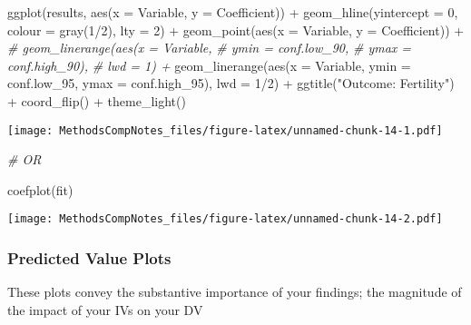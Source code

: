 \documentclass[
]{article}
\newenvironment{Shaded}{\begin{snugshade}}{\end{snugshade}}
\newcommand{\AttributeTok}[1]{\textcolor[rgb]{0.77,0.63,0.00}{#1}}
\newcommand{\CommentTok}[1]{\textcolor[rgb]{0.56,0.35,0.01}{\textit{#1}}}
\newcommand{\DecValTok}[1]{\textcolor[rgb]{0.00,0.00,0.81}{#1}}
\newcommand{\FunctionTok}[1]{\textcolor[rgb]{0.00,0.00,0.00}{#1}}
\newcommand{\NormalTok}[1]{#1}
\newcommand{\SpecialCharTok}[1]{\textcolor[rgb]{0.00,0.00,0.00}{#1}}
\newcommand{\StringTok}[1]{\textcolor[rgb]{0.31,0.60,0.02}{#1}}
\begin{document}
\begin{Shaded}
\begin{Highlighting}[]
\FunctionTok{ggplot}\NormalTok{(results, }\FunctionTok{aes}\NormalTok{(}\AttributeTok{x =}\NormalTok{ Variable, }\AttributeTok{y =}\NormalTok{ Coefficient)) }\SpecialCharTok{+}
        \FunctionTok{geom\_hline}\NormalTok{(}\AttributeTok{yintercept =} \DecValTok{0}\NormalTok{, }\AttributeTok{colour =} \FunctionTok{gray}\NormalTok{(}\DecValTok{1}\SpecialCharTok{/}\DecValTok{2}\NormalTok{), }\AttributeTok{lty =} \DecValTok{2}\NormalTok{) }\SpecialCharTok{+}
        \FunctionTok{geom\_point}\NormalTok{(}\FunctionTok{aes}\NormalTok{(}\AttributeTok{x =}\NormalTok{ Variable, }
                    \AttributeTok{y =}\NormalTok{ Coefficient)) }\SpecialCharTok{+} 
        \CommentTok{\# geom\_linerange(aes(x = Variable, }
        \CommentTok{\#              ymin = conf.low\_90,}
        \CommentTok{\#              ymax = conf.high\_90),}
        \CommentTok{\#            lwd = 1) +}
        \FunctionTok{geom\_linerange}\NormalTok{(}\FunctionTok{aes}\NormalTok{(}\AttributeTok{x =}\NormalTok{ Variable, }
                     \AttributeTok{ymin =}\NormalTok{ conf.low\_95,}
                     \AttributeTok{ymax =}\NormalTok{ conf.high\_95),}
                   \AttributeTok{lwd =} \DecValTok{1}\SpecialCharTok{/}\DecValTok{2}\NormalTok{) }\SpecialCharTok{+} 
        \FunctionTok{ggtitle}\NormalTok{(}\StringTok{"Outcome: Fertility"}\NormalTok{) }\SpecialCharTok{+}
        \FunctionTok{coord\_flip}\NormalTok{() }\SpecialCharTok{+}
  \FunctionTok{theme\_light}\NormalTok{()}
\end{Highlighting}
\end{Shaded}

\texttt{[image: MethodsCompNotes\_files/figure-latex/unnamed-chunk-14-1.pdf]}

\begin{Shaded}
\begin{Highlighting}[]
\CommentTok{\# OR}

\FunctionTok{coefplot}\NormalTok{(fit)}
\end{Highlighting}
\end{Shaded}

\texttt{[image: MethodsCompNotes\_files/figure-latex/unnamed-chunk-14-2.pdf]}

\hypertarget{predicted-value-plots}{%
\subsubsection{Predicted Value Plots}\label{predicted-value-plots}}

These plots convey the substantive importance of your findings; the
magnitude of the impact of your IVs on your DV
\end{document}
